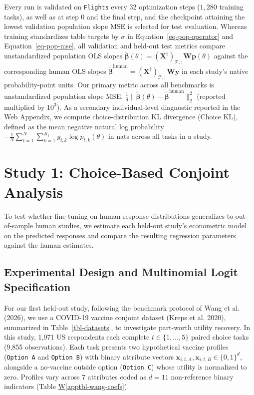 \documentclass[
  11pt,
  letterpaper,
]{article}
\newcommand*\quartoapptblref[1]{Table \hyperref[#1]{W\ref{#1}}}
\begin{document}
Every run is validated on \texttt{Flights} every \(32\) optimization
steps (\(1,280\) training tasks), as well as at step \(0\) and the final
step, and the checkpoint attaining the lowest validation population
slope MSE is selected for test evaluation. Whereas training standardizes
table targets by \(\sigma\) in Equation~\ref{eq-pop-operator} and
Equation~\ref{eq-pop-mse}, all validation and held-out test metrics
compare unstandardized population OLS slopes
\(\tilde{\boldsymbol{\beta}}(\theta) = (\mathbf{X}^\dagger)_{\mathcal{T},:}\mathbf{W}\mathbf{p}(\theta)\)
against the corresponding human OLS slopes
\(\tilde{\boldsymbol{\beta}}^{\mathrm{human}} = (\mathbf{X}^\dagger)_{\mathcal{T},:}\mathbf{W}\mathbf{y}\)
in each study's native probability-point units. Our primary metric
across all benchmarks is unstandardized population slope MSE,
\(\frac{1}{d}\lVert \tilde{\boldsymbol{\beta}}(\theta) - \tilde{\boldsymbol{\beta}}^{\mathrm{human}} \rVert_2^2\)
(reported multiplied by \(10^3\)). As a secondary individual-level
diagnostic reported in the Web Appendix, we compute choice-distribution
KL divergence (Choice KL), defined as the mean negative natural log
probability
\(-\frac{1}{N}\sum_{t=1}^N \sum_{k=1}^{K_t} y_{t,k} \log p_{t,k}(\theta)\)
in nats across all tasks in a study.

\section{Study 1: Choice-Based Conjoint Analysis}\label{sec-study1}

To test whether fine-tuning on human response distributions generalizes
to out-of-sample human studies, we estimate each held-out study's
econometric model on the predicted responses and compare the resulting
regression parameters against the human estimates.

\subsection{Experimental Design and Multinomial Logit
Specification}\label{experimental-design-and-multinomial-logit-specification}

For our first held-out study, following the benchmark protocol of Wang
et al. (2026), we use a COVID-19 vaccine conjoint dataset (Kreps et al.
2020), summarized in Table~\ref{tbl-datasets}, to investigate part-worth
utility recovery. In this study, 1,971 US respondents each complete
\(t \in \{1, \dots, 5\}\) paired choice tasks (9,855 observations). Each
task presents two hypothetical vaccine profiles (\texttt{Option\ A} and
\texttt{Option\ B}) with binary attribute vectors
\(\mathbf{x}_{i,t,A}, \mathbf{x}_{i,t,B} \in \{0, 1\}^d\), alongside a
no-vaccine outside option (\texttt{Option\ C}) whose utility is
normalized to zero. Profiles vary across \(7\) attributes coded as
\(d = 11\) non-reference binary indicators
(\quartoapptblref{apptbl-wang-coefs}).
\end{document}
